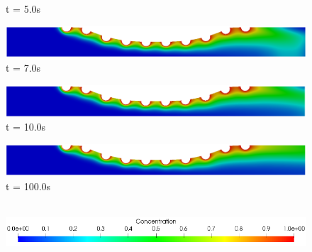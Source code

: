 \begin{figure}[H]
\begin{minipage}{.50\linewidth}
      t = 5.0s
     \end{minipage}%
     \begin{minipage}{.50\linewidth}
      \centering
      \includegraphics[scale=0.18]{./02_chaps/cap_solution/figure/conc1_quadCurvedStrut6.png}\\
      t = 7.0s
     \end{minipage}
     \begin{minipage}{.50\linewidth}
     \medskip
      \centering
      \includegraphics[scale=0.18]{./02_chaps/cap_solution/figure/conc1_quadCurvedStrut7.png}\\
      t = 10.0s
     \end{minipage}%
     \begin{minipage}{.50\linewidth}
     \medskip
      \centering
      \includegraphics[scale=0.18]{./02_chaps/cap_solution/figure/conc1_quadCurvedStrut8.png}\\
      t = 100.0s
     \end{minipage}\\[10pt]
      \centering
      \includegraphics[scale=0.5]{./02_chaps/cap_solution/figure/conc1_CurvedStrutScale.png}\\
     \medskip
     \label{quad conc field curved stent sc 1}
\end{figure}



